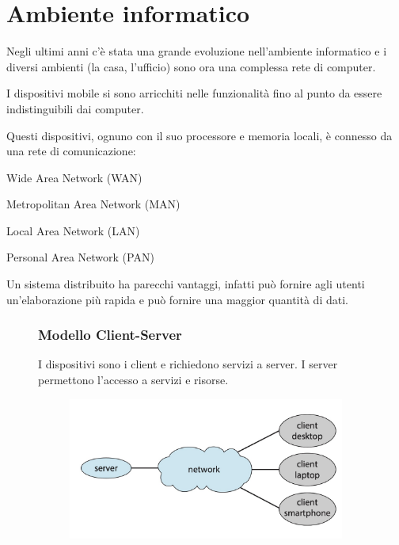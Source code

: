 \section{Ambiente informatico}
Negli ultimi anni c'è stata una grande evoluzione nell'ambiente informatico e i diversi ambienti (la casa, l'ufficio) sono ora una complessa rete di computer.

I dispositivi mobile si sono arricchiti nelle funzionalità fino al punto da essere indistinguibili dai computer.

\spacer
Questi dispositivi, ognuno con il suo processore e memoria locali, è connesso da una rete di comunicazione:
\begin{sitemize}
    \item Wide Area Network (WAN)
    \item Metropolitan Area Network (MAN)
    \item Local Area Network (LAN)
    \item Personal Area Network (PAN)
\end{sitemize}

\spacer
Un sistema distribuito ha parecchi vantaggi, infatti può fornire agli utenti un'elaborazione più rapida e può fornire una maggior quantità di dati.

\begin{figure}[H]
    \begin{minipage}{0.55\textwidth}
        \subsubsection*{Modello Client-Server}
        I dispositivi sono i client e richiedono servizi a server. I server permettono l'accesso a servizi e risorse.
    \end{minipage}
    \hfill
    \begin{minipage}{0.35\textwidth}
        \begin{figure}[H]
            \centering
            \includegraphics[width=1\linewidth]{assets/client-server.jpg}
        \end{figure}
    \end{minipage}
\end{figure}

